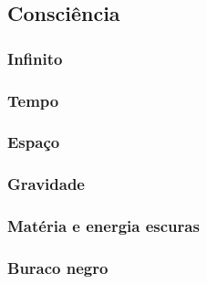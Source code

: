 \subsection{Consciência}
\lipsum[2]

\subsubsection{Infinito}
\lipsum[2] 

\subsubsection{Tempo}
\lipsum[2]

\subsubsection{Espaço}
\lipsum[2]

\subsubsection{Gravidade}
\lipsum[2]

\subsubsection{Matéria e energia escuras}
\lipsum[2]

\subsubsection{Buraco negro}
\lipsum[2]
